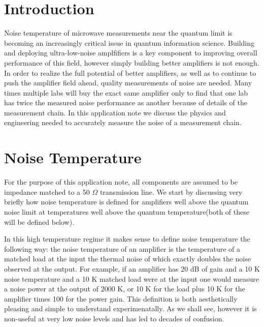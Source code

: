 \documentclass[11pt]{article}
\begin{document}
\section{
Introduction}



	Noise temperature of microwave measurements near the quantum limit is becoming an increasingly critical issue in quantum information science.  Building and deploying ultra-low-noise amplfifiers is a key component to improving overall performance of this field, however simply building better amplifiers is not enough.  In order to realize the full potential of better amplifiers, as well as to continue to push the amplifier field ahead, quality measurements of noise are needed.   Many times multiple labs will buy the exact same amplifier only to find that one lab has twice the measured noise performance as another because of details of the measurement chain.  In this application note we discuss the physics and engineering needed to accurately measure the noise of a measurement chain.


\section{
Noise Temperature}



    		For the purpose of this application note, all components are assumed to be impedance matched to a 50 $\Omega$ transmission line.  We start by discussing very briefly how noise temperature is defined for amplifiers well above the quantum noise limit at temperatures well above the quantum temperature(both of these will be defined below).  





    	In this high temperature regime it makes sense to define noise temperature the following way:  the noise temperature of an amplifier is the temperature of a matched load at the input the thermal noise of which exactly doubles the noise observed at the output.  For example, if an amplifier has 20 dB of gain and a 10 K noise temperature and a 10 K matched load were at the input one would measure a noise power at the output of 2000 K, or 10 K for the load plus 10 K for the amplifier times 100 for the power gain.  This definition is both aesthetically pleasing and simple to understand experimenatally.  As we shall see, however it is non-useful at very low noise levels and has led to decades of confusion.  
\end{document}

